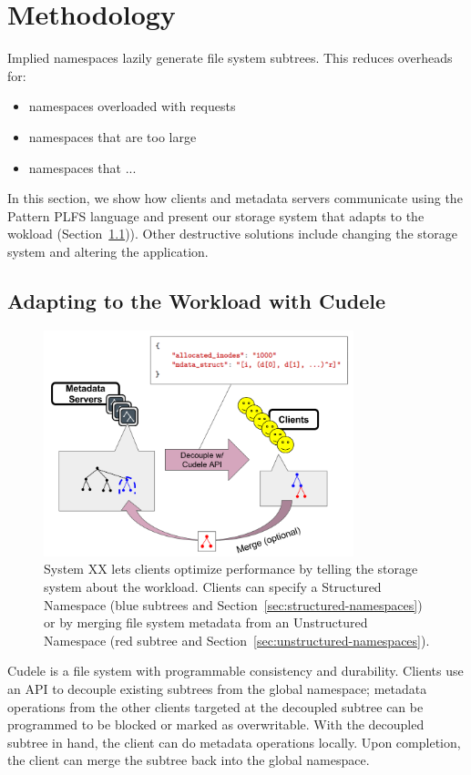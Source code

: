 \section{Methodology}

Implied namespaces lazily generate file system subtrees. This reduces overheads for:
\begin{itemize}
  \item namespaces overloaded with requests
  \item namespaces that are too large
  \item namespaces that ...
\end{itemize}

In this section, we show how clients and metadata servers communicate using the
Pattern PLFS language and present our
storage system that adapts to the wokload
(Section~\ref{sec:adapting-to-the-workload-with-cudele})).  Other destructive
solutions include changing the storage system and altering the application.

\subsection{Adapting to the Workload with Cudele}
\label{sec:adapting-to-the-workload-with-cudele}

\begin{figure}[tb]
\centering
  \includegraphics[width=90mm]{figures/arch.png} 
  \caption{System XX lets clients optimize performance by telling the storage
  system about the workload. Clients can specify a Structured Namespace (blue
  subtrees and Section~\ref{sec:structured-namespaces}) or by merging file system
  metadata from an Unstructured Namespace (red subtree and
  Section~\ref{sec:unstructured-namespaces}).}\label{fig:arch}
\end{figure}

Cudele is a file system with programmable consistency and durability. Clients
use an API to decouple existing subtrees from the global namespace; metadata
operations from the other clients targeted at the decoupled subtree can be
programmed to be blocked or marked as overwritable. With the decoupled subtree
in hand, the client can do metadata operations locally. Upon completion, the
client can merge the subtree back into the global namespace. 

